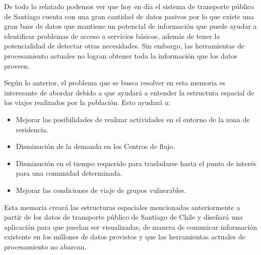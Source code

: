 \documentclass[12pt]{article}
\begin{document}
    De todo lo relatado podemos ver que hoy en día el sistema de transporte público de Santiago cuenta con una gran cantidad de datos pasivos por lo que existe una gran base de datos que mantiene un potencial de información que puede ayudar a identificar problemas de acceso a servicios básicos, además de tener la potencialidad de detectar otras necesidades. Sin embargo, las herramientas de procesamiento actuales no logran obtener toda la información que los datos proveen.

    Según lo anterior, el problema que se busca resolver en esta memoria es interesante de abordar debido a que ayudará a entender la estructura espacial de los viajes realizados por la población. Esto ayudará a:

    \begin{itemize}
    \item Mejorar las posibilidades de realizar actividades en el entorno de la zona de residencia.
    \item Disminución de la demanda en los Centros de flujo.
    \item Disminución en el tiempo requerido para trasladarse hasta el punto de interés para una comunidad determinada.
    \item Mejorar las condiciones de viaje de grupos vulnerables.
    \end{itemize}

Esta memoria creará las estructuras espaciales mencionadas anteriormente a partir de los datos de transporte público de Santiago de Chile y diseñará una aplicación para que puedan ser visualizadas, de manera de comunicar información existente en los millones de datos provistos y que las herramientas actuales de procesamiento no abarcan.


\end{document}
